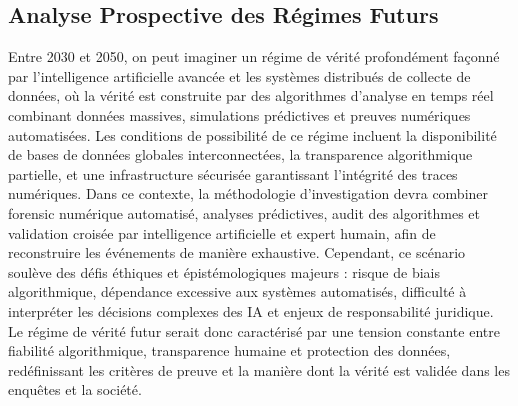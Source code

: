 \documentclass[11pt,a4paper]{article}
\begin{document}
\subsection{Analyse Prospective des Régimes Futurs}
Entre 2030 et 2050, on peut imaginer un régime de vérité profondément façonné par l’intelligence artificielle avancée et les systèmes distribués de collecte de données, où la vérité est construite par des algorithmes d’analyse en temps réel combinant données massives, simulations prédictives et preuves numériques automatisées. Les conditions de possibilité de ce régime incluent la disponibilité de bases de données globales interconnectées, la transparence algorithmique partielle, et une infrastructure sécurisée garantissant l’intégrité des traces numériques. Dans ce contexte, la méthodologie d’investigation devra combiner forensic numérique automatisé, analyses prédictives, audit des algorithmes et validation croisée par intelligence artificielle et expert humain, afin de reconstruire les événements de manière exhaustive. Cependant, ce scénario soulève des défis éthiques et épistémologiques majeurs : risque de biais algorithmique, dépendance excessive aux systèmes automatisés, difficulté à interpréter les décisions complexes des IA et enjeux de responsabilité juridique. Le régime de vérité futur serait donc caractérisé par une tension constante entre fiabilité algorithmique, transparence humaine et protection des données, redéfinissant les critères de preuve et la manière dont la vérité est validée dans les enquêtes et la société.
\end{document}
